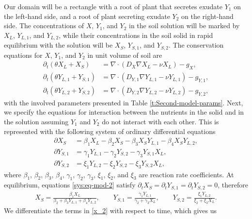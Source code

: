\documentclass[11pt]{article}
\numberwithin{equation}{section}
\begin{document}
Our domain will be a rectangle with a root of plant that secretes exudate $Y_1$ on the left-hand side, and a root of plant secreting exudate $Y_2$ on the right-hand side. The concentrations of $X$, $Y_1$, and $Y_2$ in the soil solution will be marked by $X_L$, $Y_{L,1}$, and $Y_{L,2}$, while their concentrations in the soil solid in rapid equilibrium with the solution will be $X_S$, $Y_{S,1}$, and $Y_{S,2}$. The conservation equations for $X$, $Y_1$, and $Y_2$ in unit volume of soil are
\begin{subequations}
\label{x_1}
\begin{align}
	\partial_t(\theta X_L + X_S) &= \nabla \cdot(D_X \nabla X_L - \nu X_L) - g_X, \\
	\partial_t(\theta Y_{L,1} + Y_{S,1}) &= \nabla \cdot(D_{Y,1} \nabla Y_{L,1} - \nu Y_{L,1}) - g_{Y,1}, \\
	\partial_t(\theta Y_{L,2} + Y_{S,2}) &= \nabla \cdot(D_{Y,2} \nabla Y_{L,2} - \nu Y_{L,2}) - g_{Y,2},
\end{align}
\end{subequations}
with the involved parameters presented in Table \ref{t:Second-model-params}. Next, we specify the equations for interaction between the nutrients in the solid and in the solution assuming $Y_1$ and $Y_2$ do not interact with each other. This is represented with the following system of ordinary differential equations
\begin{subequations}
\label{sys:eq-mod-2}
\begin{align}
	\partial X_S &= \beta_1 X_L - \beta_2 X_S - \beta_3 X_S Y_{L,1} - \beta_4 X_S Y_{L,2},  \\
	\partial Y_{S,1} &= \gamma_1 Y_{L,1} - \gamma_2 Y_{S,2} - \gamma_3 Y_{S,1} X_L, \\
	\partial Y_{S,2} &= \xi_1 Y_{L,2} - \xi_2 Y_{S,2} - \xi_3 Y_{S,2} X_L,
\end{align}	
\end{subequations}
where $\beta_1$, $\beta_2$, $\beta_3$, $\beta_4$, $\gamma_1$, $\gamma_2$, $\gamma_3$, $\xi_1$, $\xi_2$, and $\xi_3$ are reaction rate coefficients. At equilibrium, equations \eqref{sys:eq-mod-2} satisfy $\partial_t X_S = \partial_t Y_{S,1} = \partial_t Y_{S,2} = 0$, therefore
\begin{align}
\label{x_2} 
	X_S = \frac{\beta_1 X_L}{\beta_2 + \beta_3Y_{L,1} + \beta_4 Y_{L,2}}, 
	\qquad
	Y_{S,1} = \frac{\gamma_1 Y_{L,1}}{\gamma_2 + \gamma_3X_L},
	\qquad
	Y_{S,2} = \frac{\xi_1 Y_{L,2}}{\xi_2 + \xi_3X_L}.
\end{align}
We differentiate the terms in \eqref{x_2} with respect to time, which gives us 
\end{document}
